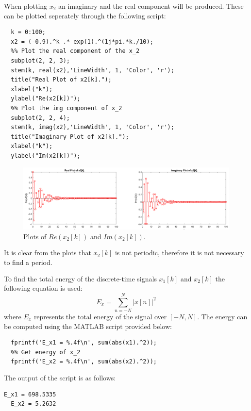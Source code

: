 \documentclass[a4paper, 10pt]{article}
\begin{document}
\noindent When plotting $x_2$ an imaginary and the real component will be produced. These can be plotted seperately 
through the following script:
\begin{lstlisting}[style=Matlab-editor, basicstyle=\small\ttfamily]
  %% Define x_2
  k = 0:100;
  x2 = (-0.9).^k .* exp(1).^(1j*pi.*k./10);
  %% Plot the real component of the x_2
  subplot(2, 2, 3);
  stem(k, real(x2),'LineWidth', 1, 'Color', 'r');
  title("Real Plot of x2[k].");
  xlabel("k");
  ylabel("Re(x2[k])");
  %% Plot the img component of x_2
  subplot(2, 2, 4);
  stem(k, imag(x2),'LineWidth', 1, 'Color', 'r');
  title("Imaginary Plot of x2[k].");
  xlabel("k");
  ylabel("Im(x2[k])");
\end{lstlisting}
\begin{figure}[H]
  \centering
  \includegraphics[width=15cm]{images/x2_plot.png}
  \caption{Plots of $Re(x_2[k])$ and $Im(x_2[k])$.}
\end{figure}
It is clear from the plots that $x_2[k]$ is not periodic, therefore it is not necessary to find a period.

\hfill

\noindent To find the total energy of the discrete-time signals $x_1[k]$ and $x_2[k]$ the following equation is used:
\begin{equation}
  E_x = \sum\limits_{n=-N}^{N} |x[n]|^2
\end{equation}
where $E_x$ represents the total energy of the signal over $[-N, N]$. The energy can be computed using the MATLAB script provided below:
\begin{lstlisting}[style=Matlab-editor, basicstyle=\small\ttfamily]
  %% Get energy of x_1
  fprintf('E_x1 = %.4f\n', sum(abs(x1).^2));
  %% Get energy of x_2
  fprintf('E_x2 = %.4f\n', sum(abs(x2).^2));
\end{lstlisting}
The output of the script is as follows:
\begin{lstlisting}[basicstyle=\small\ttfamily]
  E_x1 = 698.5335
  E_x2 = 5.2632
\end{lstlisting}
\end{document}
